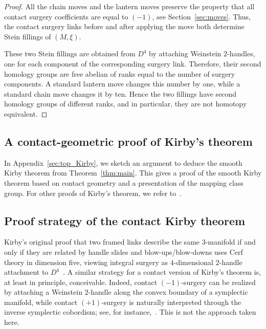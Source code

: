 \documentclass{amsart}
\numberwithin{equation}{section}
\numberwithin{figure}{section}
\theoremstyle{definition}
\theoremstyle{remark}
\let\olddxi\xi %
\renewcommand{\xi}{\olddxi}
\begin{document}
\begin{proof}
All the chain moves and the lantern moves preserve the property that all contact surgery coefficients are equal to \((-1)\), see Section~\ref{sec:moves}. Thus, the contact surgery links before and after applying the move both determine Stein fillings of \((M,\xi)\).

These two Stein fillings are obtained from \(D^4\) by attaching Weinstein \(2\)-handles, one for each component of the corresponding surgery link. Therefore, their second homology groups are free abelian of ranks equal to the number of surgery components. A standard lantern move changes this number by one, while a standard chain move changes it by ten. Hence the two fillings have second homology groups of different ranks, and in particular, they are not homotopy equivalent.
\end{proof}

\subsection{A contact-geometric proof of Kirby's theorem}

In Appendix~\ref{sec:top_Kirby}, we sketch an argument to deduce the smooth Kirby theorem from Theorem~\ref{thm:main}. This gives a proof of the smooth Kirby theorem based on contact geometry and a presentation of the mapping class group. For other proofs of Kirby's theorem, we refer to~\cite{Kirby,Matveev_Polyak_Kirbytheorem,Lu_Kirbystheorem}.

\subsection{Proof strategy of the contact Kirby theorem}
Kirby's original proof that two framed links describe the same $3$-manifold if and only if they are related by handle slides and blow-ups/blow-downs uses Cerf theory in dimension five, viewing integral surgery as $4$-dimensional $2$-handle attachment to $D^4$~\cite{Kirby}. A similar strategy for a contact version of Kirby's theorem is, at least in principle, conceivable. Indeed, contact $(-1)$-surgery can be realized by attaching a Weinstein $2$-handle along the convex boundary of a symplectic manifold, while contact $(+1)$-surgery is naturally interpreted through the inverse symplectic cobordism; see, for instance,~\cite{Eliashberg_handle,Weinstein,Geiges_book}. This is not the approach taken here.
\end{document}
